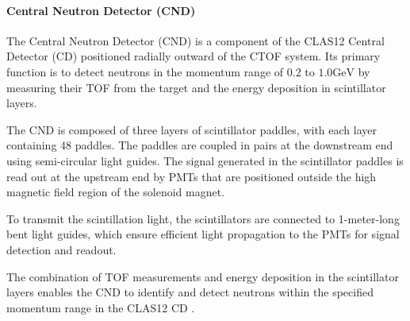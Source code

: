 \paragraph{Central Neutron Detector (CND)}
\label{par::cnd}
    The Central Neutron Detector (CND) is a component of the CLAS12 Central Detector (CD) positioned radially outward of the CTOF system.
    Its primary function is to detect neutrons in the momentum range of $0.2$ to $1.0 \text{GeV}$ by measuring their TOF from the target and the energy deposition in scintillator layers.

    The CND is composed of three layers of scintillator paddles, with each layer containing 48 paddles.
    The paddles are coupled in pairs at the downstream end using semi-circular light guides.
    The signal generated in the scintillator paddles is read out at the upstream end by PMTs that are positioned outside the high magnetic field region of the solenoid magnet.

    To transmit the scintillation light, the scintillators are connected to 1-meter-long bent light guides, which ensure efficient light propagation to the PMTs for signal detection and readout.

    The combination of TOF measurements and energy deposition in the scintillator layers enables the CND to identify and detect neutrons within the specified momentum range in the CLAS12 CD \cite{chatagnon2020}.
